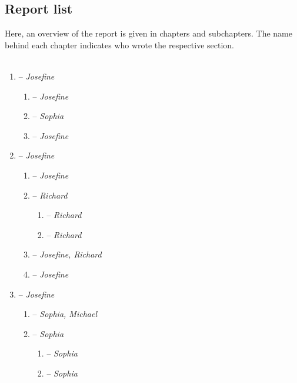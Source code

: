 \subsection{Report list}

Here, an overview of the report is given in chapters and subchapters. The name behind each chapter indicates who wrote the respective section.
\\
\\
\begin{enumerate}
\item {} -- \textit{Josefine}
	\begin{enumerate}[label*=\arabic*.]
	\item {} -- \textit{Josefine}
	\item {} -- \textit{Sophia}
	\item {} -- \textit{Josefine}
	\end{enumerate}
\item {} -- \textit{Josefine}
	\begin{enumerate}[label*=\arabic*.]
	\item {} -- \textit{Josefine}
	\item {} -- \textit{Richard}
		\begin{enumerate}[label*=\arabic*.]
		\item {} -- \textit{Richard}
		\item {} -- \textit{Richard}
		\end{enumerate}
	\item {} -- \textit{Josefine, Richard}
	\item {} -- \textit{Josefine}
	\end{enumerate}
\item {} -- \textit{Josefine}
	\begin{enumerate}[label*=\arabic*.]
	\item {} -- \textit{Sophia, Michael}
	\item {} -- \textit{Sophia}
		\begin{enumerate}[label*=\arabic*.]
		\item {} -- \textit{Sophia}
		\item {} -- \textit{Sophia}

\end{enumerate}
\end{enumerate}
\end{enumerate}
